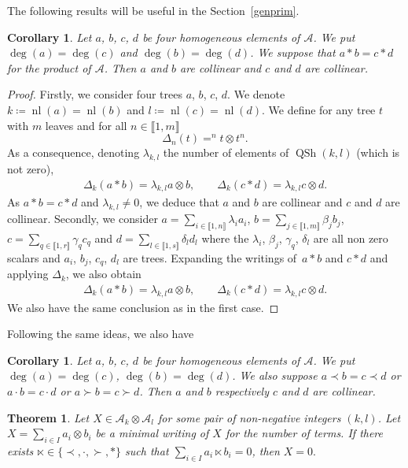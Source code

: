 \documentclass[pdftex]{sigma}
\numberwithin{equation}{section}
\theoremstyle{definition}
\theoremstyle{plain}
\newtheorem{Cor}[defi]{Corollary}
\newtheorem{thm}[defi]{Theorem}
\newcommand{\IEM}[2]{\llbracket #1,#2 \rrbracket}
\DeclareMathOperator{\batc}{QSh}
\DeclareMathOperator{\nf}{nl}
\begin{document}
The following results will be useful in the Section~\ref{genprim}.

\begin{Cor}%
Let $a$, $b$, $c$, $d$ be four homogeneous elements of $\mathcal{A}$. We put $\deg(a)=\deg(c)$ and $\deg(b)=\deg(d)$. We suppose that $a*b=c*d$ for the product of $\mathcal{A}$. Then $a$ and $b$ are collinear and $c$ and $d$ are collinear.
\end{Cor}
\begin{proof}
Firstly, we consider four trees $a$, $b$, $c$, $d$. We denote $k\coloneqq\nf(a)=\nf(b)$ and $l\coloneqq\nf(c)=\nf(d)$. We define for any tree $t$ with $m$ leaves and for all $n\in\IEM{1}{m}$
\[
\Delta_n(t)=^nt\otimes t^n.
\]
As a consequence, denoting $\lambda_{k,l}$ the number of elements of $\batc(k,l)$ (which is not zero),
\begin{gather*}
	\Delta_k(a*b)=\lambda_{k,l}a\otimes b, \qquad \Delta_{k}(c*d)=\lambda_{k,l}c\otimes d.
\end{gather*}
As $a*b=c*d$ and $\lambda_{k,l}\neq 0$, we deduce that $a$ and $b$ are collinear and $c$ and $d$ are collinear.
Secondly, we consider $a= \sum_{i\in\IEM{1}{n}} \lambda_i a_i$, $b= \sum_{j\in\IEM{1}{m}} \beta_j b_j$, $c= \sum_{q\in\IEM{1}{r}} \gamma_q c_q$ and $d= \sum_{l\in\IEM{1}{s}} \delta_l d_l$ where the $\lambda_i$, $\beta_j$, $\gamma_q$, $\delta_l$ are all non zero scalars and $a_i$, $b_j$, $c_q$, $d_l$ are trees. Expanding the writings of~$a*b$ and $c*d$ and applying $\Delta_k$, we also obtain
\begin{gather*}
	\Delta_k(a*b)=\lambda_{k,l}a\otimes b, \qquad \Delta_{k}(c*d)=\lambda_{k,l}c\otimes d.
\end{gather*}
We also have the same conclusion as in the first case.
\end{proof}

Following the same ideas, we also have
\begin{Cor}%
		Let $a$, $b$, $c$, $d$ be four homogeneous elements of $\mathcal{A}$. We put $\deg(a)=\deg(c)$, $\deg(b)=\deg(d)$. We also suppose $a\prec b=c\prec d$ or $a\cdot b=c\cdot d$ or $a\succ b=c\succ d$.
	Then $a$ and $b$ respectively $c$ and $d$ are collinear.
\end{Cor}

\begin{thm}
	\label{thm:inthom}
	Let $X\in \mathcal{A}_k\otimes \mathcal{A}_l$ for some pair of non-negative integers $(k,l)$. Let $X= \sum_{i\in I} a_i\otimes b_i$ be a minimal writing of $X$ for the number of terms. If there exists $\ltimes\in\{\prec,\cdot,\succ,*\}$ such that $ \sum_{i\in I} a_i\ltimes b_i=0$, then $X=0.$
\end{thm}
\end{document}
